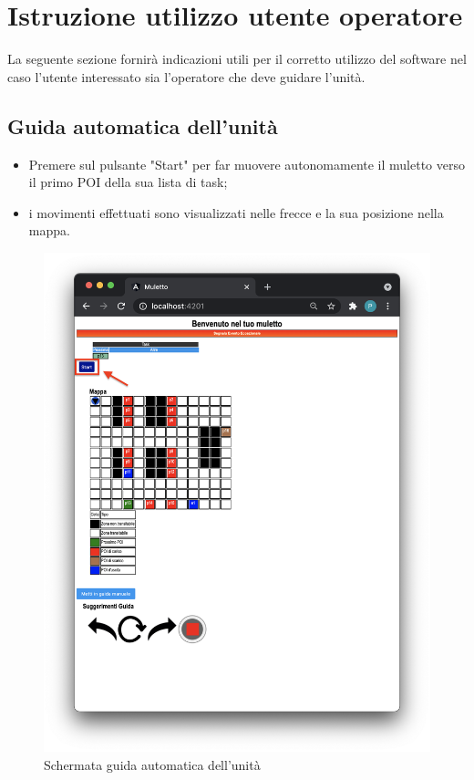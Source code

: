 \section{Istruzione utilizzo utente operatore}
La seguente sezione fornirà indicazioni utili per il corretto utilizzo del software nel caso l'utente interessato sia l'operatore che deve guidare l'unità.

\subsection{Guida automatica dell'unità}
\begin{itemize}
    \item Premere sul pulsante "Start" per far muovere autonomamente il muletto verso il primo POI della sua lista di task;
    \item i movimenti effettuati sono visualizzati nelle frecce e la sua posizione nella mappa.
    
\end{itemize}
\begin{figure}[H]
    \centering
    \includegraphics[scale=0.45]{res/images/forklift_start.png}
    \caption{Schermata guida automatica dell'unità}
\end{figure}
\pagebreak
